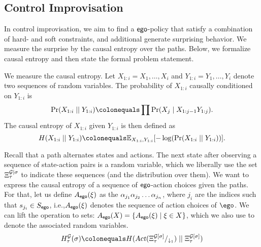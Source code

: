 {{{\subsection{Control Improvisation}
In control improvisation, we aim to find a $\pOne$-policy that satisfy a combination of hard- and soft constraints, and additional generate surprising behavior. 
We measure the surprise by the causal entropy over the paths. Below, we formalize causal entropy and then state the formal problem statement. 

We measure the causal entropy. Let $X_{1:i} = X_1, \hdots, X_i$ and $Y_{1:i} = Y_1,\hdots,Y_i$ denote two sequences of random variables. The probability of $ X_{1:i}$ causally conditioned on $Y_{1:i}$ is 
\[ \causalprob{X_{1:i}}{Y_{1:i}} \colonequals \prod \Pr(X_j \mid X_{1:j-1}Y_{1:j}). \]
The causal entropy of $X_{1:i}$ given $Y_{1:i}$ is then defined as 
\[  H(X_{1:i}\mid\mid Y_{1:i}) \colonequals \expOver{X_{1:i},Y_{1:i}}{-\log(\causalprob{X_{1:i}}{Y_{1:i}})}.\] 

 Recall that a path alternates states and actions. The next state after observing a sequence of state-action pairs is a random variable, which we liberally use the set $\Paths[\tau]{\sg \mid \sched}$ to indicate these sequences (and the distribution over them).  We want to express the causal entropy of a sequence of $\pOne$-action choices given the paths. For that, let us define $\Act_\pOne(\path)$ as the $\act_{j_1} \act_{j_2} \hdots \act_{j_n}$, where $j_i$ are the indices such that $s_{j_i} \in S_\pOne$, i.e.,$\Act_\pOne(\path)$ denotes the sequence of action choices of $\ego$. We can lift the operation to sets: $\Act_\pOne(X) = \{ \Act_\pOne(\path) \mid \path \in X \}$, which we also use to denote the associated random variables.
\[ H^\sg_\tau(\sigma) \colonequals H( \textsl{Act}(\POnePaths[\tau]{\sg[\sched]})   \mid\mid \Paths[\tau]{\sg[\sched]} )  \]


\begin{example}
	
\end{example}

}}}
